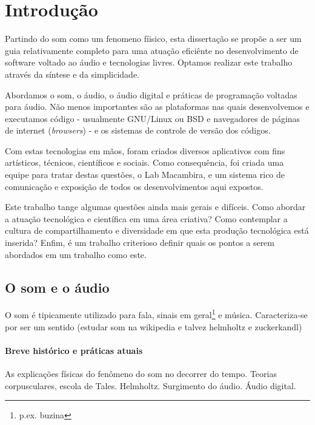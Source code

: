 \chapter{Introdução} %
\label{cap:intro} %
Partindo do som como um fenomeno fíisico, esta dissertação se propõe a ser um guia relativamente 
completo para uma atuação eficiênte no desenvolvimento
de software voltado ao áudio e tecnologias livres. Optamos
realizar este trabalho através da síntese e da simplicidade. 

Abordamos o som, o áudio, o áudio digital e práticas de programação voltadas para
áudio. Não menos importantes são as plataformas nas quais desenvolvemos e executamos código
- usualmente GNU/Linux ou BSD e navegadores de páginas de internet (\emph{browsers}) - e
os sistemas de controle de versão dos códigos.

Com estas tecnologias em mãos, foram criados diversos aplicativos com fins artísticos,
técnicos, científicos e sociais. Como consequência, foi criada uma equipe para tratar
destas questões, o Lab Macambira, e um sistema rico de comunicação e exposição de todos
os desenvolvimentos aqui expostos.

Este trabalho tange algumas questões ainda mais gerais e difíceis.
Como abordar a atuação tecnológica e científica em uma área criativa? Como contemplar
a cultura de compartilhamento e diversidade em que esta produção tecnológica está inserida?
Enfim, é um trabalho criterioso definir quais os pontos a serem abordados em
um trabalho como este.


  \section{O som e o áudio}
  O som é tipicamente utilizado para fala, sinais em geral\footnote{p.ex. buzina} e música.
  Caracteriza-se por ser um sentido (estudar som na wikipedia e talvez helmholtz e zuckerkandl)


	  \subsubsection{Breve histórico e práticas atuais}
	As explicações físicas do fenômeno do som no decorrer do tempo. Teorias
	corpusculares, escola de Tales. Helmholtz. Surgimento do áudio. Áudio digital.


